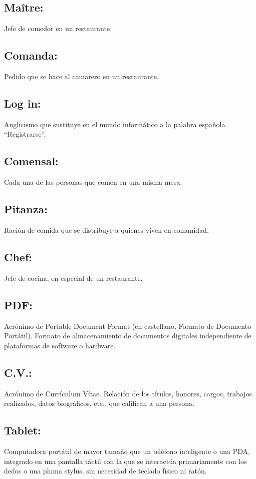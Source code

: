 \documentclass[spanish,a4paper,11pt, twoside]{report}	%
\begin{document}
\newpage
\mbox{}
\thispagestyle{empty}						%
\newpage


\tableofcontents 							%

\newpage
\mbox{}
\thispagestyle{empty}						%
\newpage	

\subsection{Maître:} Jefe de comedor en un restaurante. 
\subsection{Comanda:} Pedido que se hace al camarero en un restaurante.
\subsection{Log in:} Anglicismo que sustituye en el mundo informático a la palabra española “Registrarse”.
\subsection{Comensal:} Cada una de las personas que comen en una misma mesa.
\subsection{Pitanza:} Ración de comida que se distribuye a quienes viven en comunidad.
\subsection{Chef:} Jefe de cocina, en especial de un restaurante.
\subsection{PDF:} Acrónimo de Portable Document Format (en castellano, Formato de Documento Portátil). Formato de almacenamiento de documentos digitales independiente de plataformas de software o hardware.
\subsection{C.V.:}Acrónimo de Currículum Vítae. Relación de los títulos, honores, cargos, trabajos realizados, datos biográficos, etc., que califican a una persona.
\subsection{Tablet:} Computadora portátil de mayor tamaño que un teléfono inteligente o una PDA, integrado en una pantalla táctil con la que se interactúa primariamente con los dedos o una pluma stylus, sin necesidad de teclado físico ni ratón.
\end{document}
